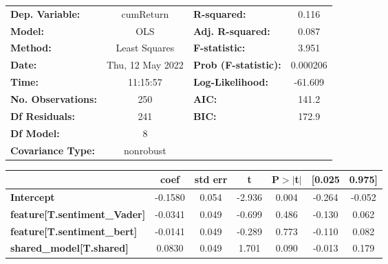 \begin{center}
\begin{tabular}{lclc}
\toprule
\textbf{Dep. Variable:}                       &    cumReturn     & \textbf{  R-squared:         } &     0.116   \\
\textbf{Model:}                               &       OLS        & \textbf{  Adj. R-squared:    } &     0.087   \\
\textbf{Method:}                              &  Least Squares   & \textbf{  F-statistic:       } &     3.951   \\
\textbf{Date:}                                & Thu, 12 May 2022 & \textbf{  Prob (F-statistic):} &  0.000206   \\
\textbf{Time:}                                &     11:15:57     & \textbf{  Log-Likelihood:    } &   -61.609   \\
\textbf{No. Observations:}                    &         250      & \textbf{  AIC:               } &     141.2   \\
\textbf{Df Residuals:}                        &         241      & \textbf{  BIC:               } &     172.9   \\
\textbf{Df Model:}                            &           8      & \textbf{                     } &             \\
\textbf{Covariance Type:}                     &    nonrobust     & \textbf{                     } &             \\
\bottomrule
\end{tabular}
\begin{tabular}{lcccccc}
                                              & \textbf{coef} & \textbf{std err} & \textbf{t} & \textbf{P$> |$t$|$} & \textbf{[0.025} & \textbf{0.975]}  \\
\midrule
\textbf{Intercept}                            &      -0.1580  &        0.054     &    -2.936  &         0.004        &       -0.264    &       -0.052     \\
\textbf{feature[T.sentiment\_Vader]}          &      -0.0341  &        0.049     &    -0.699  &         0.486        &       -0.130    &        0.062     \\
\textbf{feature[T.sentiment\_bert]}           &      -0.0141  &        0.049     &    -0.289  &         0.773        &       -0.110    &        0.082     \\
\textbf{shared\_model[T.shared]}              &       0.0830  &        0.049     &     1.701  &         0.090        &       -0.013    &        0.179     \\

\end{tabular}
\end{center}
